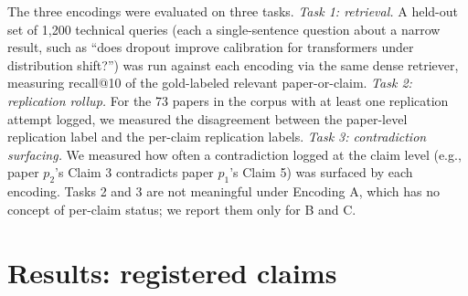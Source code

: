 \documentclass{rrxiv}
\begin{document}
The three encodings were evaluated on three tasks. \emph{Task 1: retrieval.} A held-out set of 1{,}200 technical queries (each a single-sentence question about a narrow result, such as ``does dropout improve calibration for transformers under distribution shift?'') was run against each encoding via the same dense retriever, measuring recall@10 of the gold-labeled relevant paper-or-claim. \emph{Task 2: replication rollup.} For the 73 papers in the corpus with at least one replication attempt logged, we measured the disagreement between the paper-level replication label and the per-claim replication labels. \emph{Task 3: contradiction surfacing.} We measured how often a contradiction logged at the claim level (e.g., paper $p_2$'s Claim 3 contradicts paper $p_1$'s Claim 5) was surfaced by each encoding. Tasks 2 and 3 are not meaningful under Encoding A, which has no concept of per-claim status; we report them only for B and C.

\section{Results: registered claims}
\end{document}
